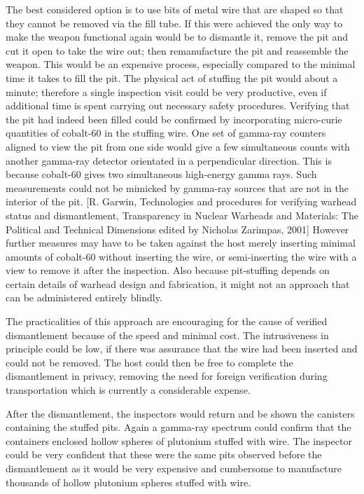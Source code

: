 \documentclass[twocolumn,a4paper]{article}
\begin{document}
The best considered option is to use bits of metal wire that are shaped so that 
they cannot be removed via the fill tube. 
If this were achieved the only way to make the weapon functional again would be 
to dismantle it, remove the pit and cut it open to take the wire out; then 
remanufacture the pit and reassemble the weapon. This would be an expensive 
process, especially compared to the minimal time it takes to fill the pit.
The physical act of stuffing the pit would about a minute; therefore a single 
inspection visit could be very productive, even if additional time is spent 
carrying out necessary safety procedures. 
Verifying that the pit had indeed been filled could be confirmed by incorporating 
micro-curie quantities of cobalt-60 in the stuffing wire. One set of gamma-ray 
counters aligned to view the pit from one side would give a few simultaneous 
counts with another gamma-ray detector orientated in a perpendicular direction. 
This is because cobalt-60 gives two simultaneous high-energy gamma rays. Such 
measurements could not be mimicked by gamma-ray sources that are not in the 
interior of the pit. 
[R. Garwin, Technologies and procedures for verifying warhead status and 
dismantlement, Transparency in Nuclear Warheads and Materials: The Political 
and Technical Dimensions edited by Nicholas Zarimpas, 2001]
However further measures may have to be taken against the host merely inserting 
minimal amounts of cobalt-60 without inserting the wire, or semi-inserting the 
wire with a view to remove it after the inspection. Also because pit-stuffing 
depends on certain details of warhead design and fabrication, it might not an 
approach that can be administered entirely blindly. 

The practicalities of this approach are encouraging for the cause of verified 
dismantlement because of the speed and minimal cost. The intrusiveness in 
principle could be low, if there was assurance that the wire had been inserted 
and could not be removed. The host could then be free to complete the 
dismantlement in privacy, removing the need for foreign verification during 
transportation which is currently a considerable expense.

After the dismantlement, the inspectors would return and be shown the canisters 
containing the stuffed pits. Again a gamma-ray spectrum could confirm that the 
containers enclosed hollow spheres of plutonium stuffed with wire. The inspector 
could be very confident that these were the same pits observed before the 
dismantlement as it would be very expensive and cumbersome to manufacture 
thousands of hollow plutonium spheres stuffed with wire.
\end{document}
